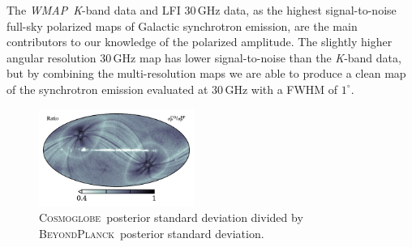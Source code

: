 \documentclass[twocolumn]{../../common/aa}
\def\WMAP{\emph{WMAP}}
\def\WMAPnine{\emph{WMAP9}}
\def\Planck{\emph{Planck}}
\def\commanderthree{\texttt{Commander3}}
\newcommand{\bp}{\textsc{BeyondPlanck}}
\newcommand{\cosmoglobe}{\textsc{Cosmoglobe}}
\newcommand{\K}[0]{\textit K}
\begin{document}
The \WMAP\ \K-band data and LFI 30\,GHz data, as the highest signal-to-noise full-sky polarized maps of Galactic synchrotron emission, are the main contributors to our knowledge of the polarized amplitude. The slightly higher angular resolution 30\,GHz map has lower signal-to-noise than the \K-band data, but by combining the multi-resolution maps we are able to produce a clean map of the synchrotron emission evaluated at 30\,GHz with a FWHM of $1^\circ$.




\begin{figure}
	\centering
	\includegraphics[width=0.45\textwidth]{figures/polint_sigma_ratio.pdf}
	\caption{
		\cosmoglobe\ posterior standard deviation divided by \bp\ posterior standard deviation.
		}
		\label{fig:rms_ratios}
\end{figure}
\end{document}

